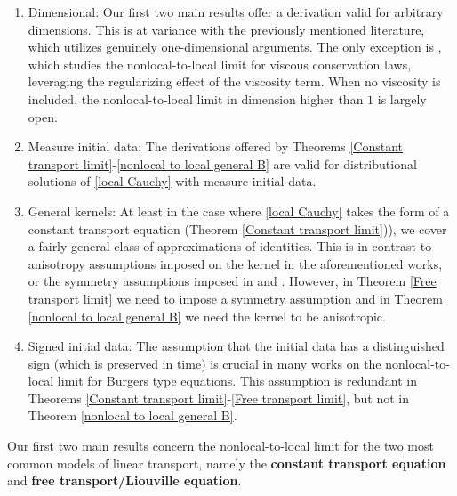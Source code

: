\documentclass[11pt,reqno]{amsart}
\numberwithin{equation}{section}
\begin{document}
\begin{enumerate}
    \item Dimensional: Our first two main results offer a derivation valid for arbitrary dimensions. This is at variance with the previously mentioned literature, which utilizes genuinely one-dimensional arguments. The only exception is \cite{coclite2025singular}, which studies the nonlocal-to-local limit for viscous conservation laws, leveraging the regularizing effect of the viscosity term. When no viscosity is included, the nonlocal-to-local limit in dimension higher than $1$ is largely open.   
    \item Measure initial data: The derivations offered by Theorems \ref{Constant transport limit}-\ref{nonlocal to local general B} are valid for distributional solutions of \eqref{local Cauchy} with measure initial data. 
    \item General kernels: At least in the case  where \eqref{local Cauchy} takes the form of a constant transport equation (Theorem \ref{Constant transport limit})), we cover a fairly general class of approximations of identities. This is in contrast to anisotropy assumptions imposed on the kernel in the aforementioned works, or the symmetry assumptions imposed in \cite{zumbrun1999nonlocal} and \cite{ghoshal2024non}. However, in Theorem \ref{Free transport limit} we need to impose a symmetry assumption and in Theorem \ref{nonlocal to local general B} we need the kernel to be anisotropic.    
    \item Signed initial data: The assumption that the initial data has a distinguished sign (which is preserved in time) is crucial in many works on the nonlocal-to-local limit for Burgers type equations. This assumption is redundant in Theorems \ref{Constant transport limit}-\ref{Free transport limit}, but not in Theorem \ref{nonlocal to local general B}. 
\end{enumerate}
Our first two main results concern the nonlocal-to-local limit for the two most common models of linear transport, namely the \textbf{constant transport  equation} and \textbf{free transport/Liouville equation}.  
\end{document}

